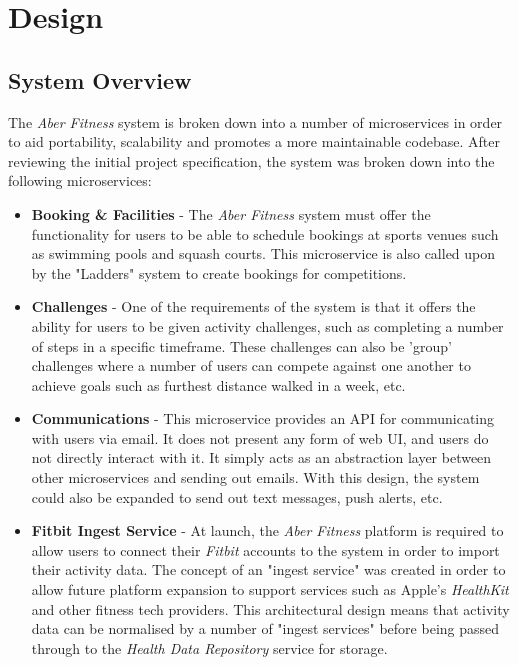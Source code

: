 \chapter{Design}

\section{System Overview}
The \textit{Aber Fitness} system is broken down into a number of microservices in order to aid portability, scalability and promotes a more maintainable codebase. After reviewing the initial project specification, the system was broken down into the following microservices:

\begin{itemize}

	\item \textbf{Booking \& Facilities} - The \textit{Aber Fitness} system must offer the functionality for users to be able to schedule bookings at sports venues such as swimming pools and squash courts. This microservice is also called upon by the "Ladders" system to create bookings for competitions.

	\item \textbf{Challenges} - One of the requirements of the system is that it offers the ability for users to be given activity challenges, such as completing a number of steps in a specific timeframe. These challenges can also be 'group' challenges where a number of users can compete against one another to achieve goals such as furthest distance walked in a week, etc.

	\item \textbf{Communications} - This microservice provides an API for communicating with users via email. It does not present any form of web UI, and users do not directly interact with it. It simply acts as an abstraction layer between other microservices and sending out emails. With this design, the system could also be expanded to send out text messages, push alerts, etc.

	\item \textbf{Fitbit Ingest Service} - At launch, the \textit{Aber Fitness} platform is required to allow users to connect their \textit{Fitbit} accounts to the system in order to import their activity data. The concept of an "ingest service" was created in order to allow future platform expansion to support services such as Apple's \textit{HealthKit} and other fitness tech providers. This architectural design means that activity data can be normalised by a number of "ingest services" before being passed through to the \textit{Health Data Repository} service for storage. 


\end{itemize}
